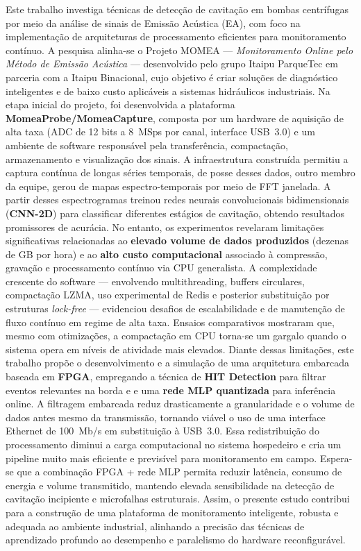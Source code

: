 \documentclass[
	12pt,				%
	oneside,
	a4paper,			%
	english,			%
	french,				%
	spanish,			%
	brazil				%
	]{abntex2}
\begin{document}

\begin{resumo}
	Este trabalho investiga técnicas de detecção de cavitação em bombas centrífugas por meio da análise de sinais de Emissão Acústica (EA), com foco na implementação de arquiteturas de processamento eficientes para monitoramento contínuo. A pesquisa alinha-se o Projeto MOMEA — \textit{Monitoramento Online pelo Método de Emissão Acústica} — desenvolvido pelo grupo Itaipu ParqueTec em parceria com a Itaipu Binacional, cujo objetivo é criar soluções de diagnóstico inteligentes e de baixo custo aplicáveis a sistemas hidráulicos industriais.	
	Na etapa inicial do projeto, foi desenvolvida a plataforma \textbf{MomeaProbe/MomeaCapture}, composta por um hardware de aquisição de alta taxa (ADC de 12 bits a 8~MSps por canal, interface USB~3.0) e um ambiente de software responsável pela transferência, compactação, armazenamento e visualização dos sinais. A infraestrutura construída permitiu a captura contínua de longas séries temporais, de posse desses dados, outro membro da equipe, gerou de mapas espectro-temporais por meio de FFT janelada. A partir desses espectrogramas treinou redes neurais convolucionais bidimensionais (\textbf{CNN-2D}) para classificar diferentes estágios de cavitação, obtendo resultados promissores de acurácia.	
	No entanto, os experimentos revelaram limitações significativas relacionadas ao \textbf{elevado volume de dados produzidos} (dezenas de GB por hora) e ao \textbf{alto custo computacional} associado à compressão, gravação e processamento contínuo via CPU generalista. A complexidade crescente do software — envolvendo multithreading, buffers circulares, compactação LZMA, uso experimental de Redis e posterior substituição por estruturas \textit{lock-free} — evidenciou desafios de escalabilidade e de manutenção de fluxo contínuo em regime de alta taxa. Ensaios comparativos mostraram que, mesmo com otimizações, a compactação em CPU torna-se um gargalo quando o sistema opera em níveis de atividade mais elevados.	
	Diante dessas limitações, este trabalho propõe o desenvolvimento e a simulação de uma arquitetura embarcada baseada em \textbf{FPGA}, empregando a técnica de \textbf{HIT Detection} para filtrar eventos relevantes na borda e e uma \textbf{rede MLP quantizada} para inferência online. A filtragem embarcada reduz drasticamente a granularidade e o volume de dados antes mesmo da transmissão, tornando viável o uso de uma interface Ethernet de 100~Mb/s em substituição à USB~3.0. Essa redistribuição do processamento diminui a carga computacional no sistema hospedeiro e cria um pipeline muito mais eficiente e previsível para monitoramento em campo.	
	Espera-se que a combinação FPGA + rede MLP permita reduzir latência, consumo de energia e volume transmitido, mantendo elevada sensibilidade na detecção de cavitação incipiente e microfalhas estruturais. Assim, o presente estudo contribui para a construção de uma plataforma de monitoramento inteligente, robusta e adequada ao ambiente industrial, alinhando a precisão das técnicas de aprendizado profundo ao desempenho e paralelismo do hardware reconfigurável.
	
\end{resumo}
\end{document}
